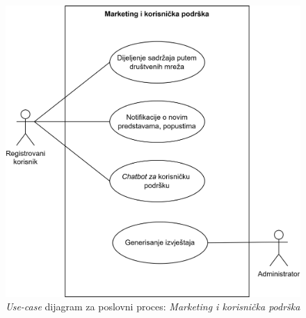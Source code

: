 \newpage
\vspace*{0pt}
\begin{figure}[t!]
    \centering
    \includegraphics[width=0.6\linewidth]{Slike/Poslovni procesi/PP3.drawio.png}
    \caption{\textit{Use-case} dijagram za poslovni proces: \textit{Marketing i korisnička podrška}}
    \label{fig:pp3}
\end{figure}
\newpage